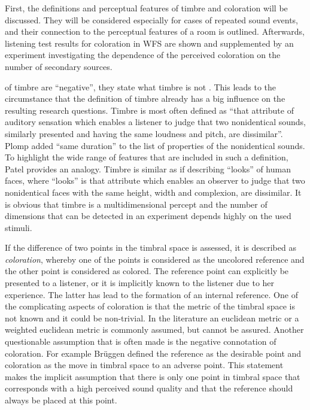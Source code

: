 First, the definitions and perceptual features of timbre and coloration
will be discussed. They will be considered especially for cases of repeated sound
events, and their connection to the perceptual features of a room is outlined.
Afterwards, listening test results for coloration in \ac{WFS} are shown and supplemented by
an experiment investigating the dependence of the perceived coloration
on the number of secondary sources.

 of timbre are ``negative'', they state what timbre is not
. This leads to the circumstance that the definition of timbre already has
a big influence on the resulting research questions.  Timbre is most often
defined as ``that attribute of auditory sensation which enables a listener to
judge that two nonidentical sounds, similarly presented and having the same
loudness and pitch, are dissimilar''.\autocite{ANSI1994} Plomp added
``same duration'' to the list of properties of the nonidentical
sounds.\autocite[][p.\,285]{Moore2012a} To highlight the wide range of features
that are included in such a definition, Patel\autocite{Patel2010} provides an
analogy. Timbre is similar as if describing ``looks'' of
human faces, where ``looks'' is that attribute which enables an observer to judge
that two nonidentical faces with the same height, width and complexion, are
dissimilar.  It is obvious that timbre is a multidimensional percept
and the number of dimensions that can be detected in an experiment depends highly
on the used stimuli.

If the difference of two points in the timbral space is assessed, it is
described as \emph{coloration}, whereby one of the points is considered as
the uncolored reference and
the other point is considered as colored. The reference point can explicitly be
presented to a
listener, or it is implicitly known to the listener due to her experience. The latter
has lead to the formation of an internal reference.
One of the complicating aspects of coloration is that the metric of the
timbral space is not known and it could be non-trivial. In the literature
an euclidean metric\autocite[See for example][]{Plomp1967} or a weighted euclidean
metric\autocite[An example and discussion of different metrices is presented in][]{McAdams1995}
is commonly assumed, but cannot be assured.
Another questionable assumption that is often made is the negative connotation
of coloration. For example Brüggen\autocite[][p.\,8; note that on p.\,13 he
relativates his opinion by stating that for performances such as music played in a
concert hall the coloration due to the room is a desired one and the perceived
quality of the sound is  better for the colored case]{Bruggen2001}
defined the reference
as the desirable point and coloration as the move in timbral space to an adverse
point. This statement makes the implicit assumption that there is only one point in
timbral space that corresponds with a high perceived sound quality and that the
reference should always be placed at this point.


